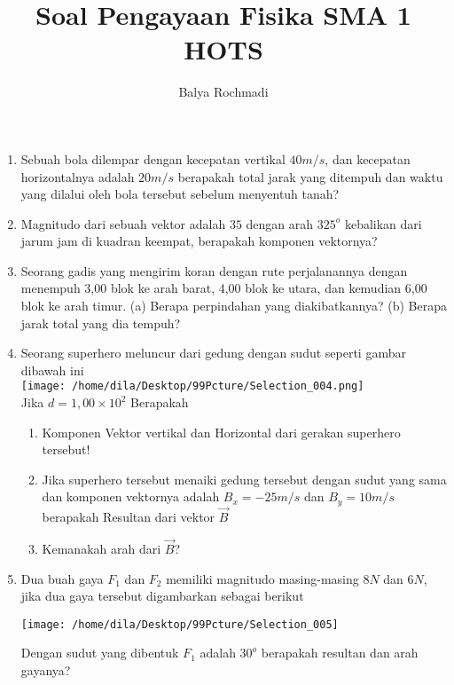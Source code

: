 \documentclass[12pt,a4paper,onecolumn]{article}
\author{Balya Rochmadi}
\title{\Large Soal Pengayaan Fisika SMA 1 HOTS}
\begin{document}
	\large
	\maketitle
	\begin{enumerate}
		\item Sebuah bola dilempar dengan kecepatan vertikal $40m/s$, dan kecepatan horizontalnya adalah $20 m/s$ berapakah total jarak yang ditempuh dan waktu yang dilalui oleh bola tersebut sebelum menyentuh tanah?
		\item Magnitudo dari sebuah vektor adalah $35$ dengan arah $325^o$ kebalikan dari jarum jam di kuadran keempat, berapakah komponen vektornya?
		\item Seorang gadis yang mengirim koran dengan rute perjalanannya dengan menempuh 3,00 blok ke arah barat, 4,00 blok ke utara, dan kemudian 6,00 blok ke arah timur. (a) Berapa perpindahan yang diakibatkannya? (b) Berapa jarak total yang dia tempuh?
		\item Seorang superhero meluncur dari gedung dengan sudut seperti gambar dibawah ini\\
		
		\texttt{[image: /home/dila/Desktop/99Pcture/Selection\_004.png]}\\
		Jika $d=1,00\times 10^2$ Berapakah
		\begin{enumerate}
			\item Komponen Vektor vertikal dan Horizontal dari gerakan superhero tersebut!
			\item Jika superhero tersebut menaiki gedung tersebut dengan sudut yang sama dan komponen vektornya adalah $B_x=-25m/s$ dan $B_y=10m/s$ berapakah Resultan dari vektor $\vec{B}$
			\item Kemanakah arah dari $\vec{B}$?
		\end{enumerate}
		\item Dua buah gaya $F_1$ dan $F_2$ memiliki magnitudo masing-masing $8N$ dan $6N$, jika dua gaya tersebut digambarkan sebagai berikut
		
\begin{center}
\texttt{[image: /home/dila/Desktop/99Pcture/Selection\_005]}
\end{center}
		Dengan sudut yang dibentuk $F_1$ adalah $30^o$ berapakah resultan dan arah gayanya? 

	\end{enumerate}
\end{document}
